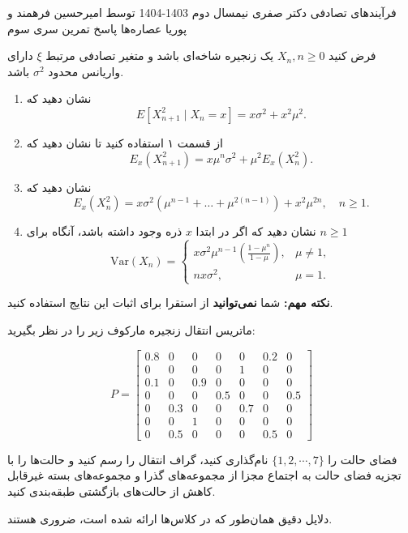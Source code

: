 \documentclass[11pt, a4, twoside]{article}
\begin{document}
	\pagestyle{empty}
	\heading
	{فرآیندهای تصادفی}
	{دکتر صفری}
	{نیمسال دوم 1403-1404}
    {توسط امیرحسین فرهمند و پوریا عصاره‌ها}
    {پاسخ تمرین سری سوم}
	\begin{problem} %
			
	\noindent فرض کنید $X_n, n \geq 0$ یک زنجیره شاخه‌ای باشد و متغیر تصادفی مرتبط $\xi$ دارای واریانس محدود $\sigma^2$ باشد.

	\begin{enumerate}
		\item نشان دهید که
		\[
		E[X_{n+1}^2 \mid X_n = x] = x\sigma^2 + x^2\mu^2.
		\]
		
		\item از قسمت ۱ استفاده کنید تا نشان دهید که
		\[
		E_x(X_{n+1}^2) = x\mu^n\sigma^2 + \mu^2 E_x(X_n^2).
		\]
		
		\item نشان دهید که
		\[
		E_x(X_n^2) = x\sigma^2(\mu^{n-1} + \dots + \mu^{2(n-1)}) + x^2\mu^{2n}, \quad n \geq 1.
		\]
		
		\item نشان دهید که اگر در ابتدا $x$ ذره وجود داشته باشد، آنگاه برای $n \geq 1$
		\[
		\text{Var} (X_n) =
		\begin{cases}
		x\sigma^2 \mu^{n-1} \left(\frac{1 - \mu^n}{1 - \mu}\right), & \mu \neq 1, \\ 
		n x \sigma^2, & \mu = 1.
		\end{cases}
		\]
	\end{enumerate}
	\noindent \textbf{نکته مهم:} شما \textbf{نمی‌توانید} از استقرا برای اثبات این نتایج استفاده کنید.

	\end{problem}

	\begin{problem} %
		ماتریس انتقال زنجیره مارکوف زیر را در نظر بگیرید:

		\[
		P =
		\begin{bmatrix}
		0.8 & 0 & 0 & 0 & 0 & 0.2 & 0 \\
		0 & 0 & 0 & 0 & 1 & 0 & 0 \\
		0.1 & 0 & 0.9 & 0 & 0 & 0 & 0 \\
		0 & 0 & 0 & 0.5 & 0 & 0 & 0.5 \\
		0 & 0.3 & 0 & 0 & 0.7 & 0 & 0 \\
		0 & 0 & 1 & 0 & 0 & 0 & 0 \\
		0 & 0.5 & 0 & 0 & 0 & 0.5 & 0
		\end{bmatrix}
		\]

		فضای حالت را $\{1, 2, \cdots, 7\}$ نام‌گذاری کنید، گراف انتقال را رسم کنید و حالت‌ها را با تجزیه فضای حالت به اجتماع مجزا از مجموعه‌های گذرا و مجموعه‌های بسته غیرقابل کاهش از حالت‌های بازگشتی طبقه‌بندی کنید.

		دلایل دقیق همان‌طور که در کلاس‌ها ارائه شده است، ضروری هستند.
	\end{problem}
	
\end{document}

